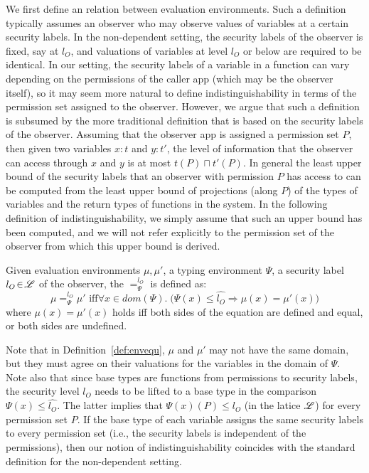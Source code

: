 {{{We first define an  relation between evaluation environments.
Such a definition typically assumes an observer who may observe values of variables at a certain security labels.
In the non-dependent setting, the security labels of the observer is fixed, say at $l_O$, and valuations
of variables at level $l_O$ or below are required to be identical. In our setting, the security labels of
a variable in a function can vary depending on the permissions of the caller app (which may be the observer itself), so
it may seem more natural to define indistinguishability in terms of the permission set assigned to the observer. However,
we argue that such a definition is subsumed by the  
more traditional definition that is based on the security labels of the observer.
Assuming that the observer app is assigned a permission set $P$, 
then given two variables $x : t$ and $y : t'$,
the level of information that the observer can access through $x$ and $y$ is at most $t(P) \sqcap t'(P).$
In general the least upper bound of the security labels that an observer with permission $P$ has access to can
be computed from the least upper bound of projections (along $P$) of the types of variables and the return types
of functions in the system.
In the following definition of indistinguishability, we simply assume that
such an upper bound has been computed, and we will not refer explicitly to the permission set of the observer from
which this upper bound is derived.


\begin{definition}\label{def:envequ}
Given evaluation environments $\mu, \mu'$,
a typing environment $\Psi$, a security label $l_O\!\in\!\mathscr{L}$ of the observer,
the {}  $=_{\Psi}^{l_O}$ is defined as:
{\myeqsize\begin{equation*}
\mu =_{\Psi}^{l_{O}} \mu' \text{ iff}
\forall x\in dom(\Psi) .\; \big(\Psi(x) \leq \hat{l_{O}} \Rightarrow \mu(x) = \mu'(x) \big)
\end{equation*}}
where
$\mu(x) = \mu'(x)$ holds iff both sides of the equation are defined and equal,
or both sides are undefined.
\end{definition}

Note that in Definition~\ref{def:envequ}, $\mu$ and $\mu'$ may not have the same domain, but they must agree on
their valuations for the variables in the domain of $\Psi$. 
Note also that since base types are functions from permissions to security labels, the security
level $l_O$ needs to be lifted to a base type in the comparison $\Psi(x) \leq \hat{l_{O}}$.
The latter implies that
$\Psi(x)(P) \leq l_O$ (in the latice $\mathscr{L}$) for every permission set $P.$
If the base type of each variable assigns the same security labels to every permission set (i.e., the security labels
is independent of the permissions), then our notion of indistinguishability coincides with the standard definition
for the non-dependent setting.



}}}
